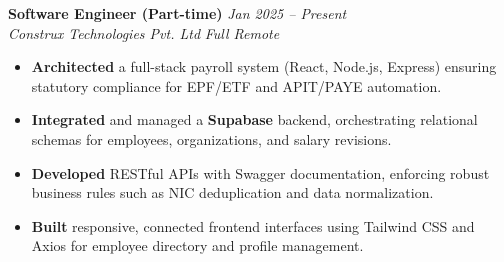 \noindent
\textbf{Software Engineer (Part-time)} \hfill \textit{Jan 2025 -- Present}\\
\textit{Construx Technologies Pvt. Ltd} \hfill \textit{Full Remote}\\[0.05em]
\begin{itemize}[leftmargin=*, itemsep=0.1em, topsep=0.1em]
    \item \textbf{Architected} a full-stack payroll system (React, Node.js, Express) ensuring statutory compliance for EPF/ETF and APIT/PAYE automation.
    \item \textbf{Integrated} and managed a \textbf{Supabase} backend, orchestrating relational schemas for employees, organizations, and salary revisions.
    \item \textbf{Developed} RESTful APIs with Swagger documentation, enforcing robust business rules such as NIC deduplication and data normalization.
    \item \textbf{Built} responsive, connected frontend interfaces using Tailwind CSS and Axios for employee directory and profile management.
\end{itemize}

